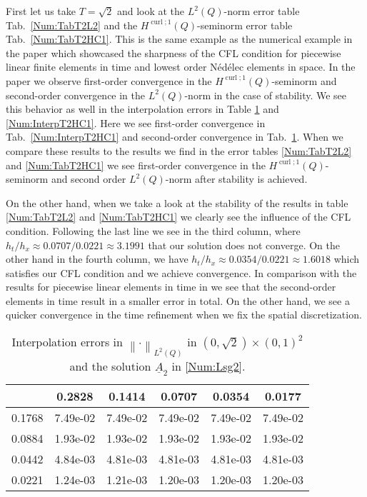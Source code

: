 \documentclass[a4paper,11pt]{article}
\newcommand{\cu}{\operatorname{curl}}
\renewcommand{\vec}[1]{\underline{#1}}
\newcommand{\norm}[1]{{\left\lVert{#1}\right\rVert}}
\begin{document}
First let us take $T=\sqrt{2}$ and look at the $L^2(Q)$-norm error table Tab.~\ref{Num:TabT2L2}  and the $H^{\cu;1}(Q)$-seminorm error  table Tab.~\ref{Num:TabT2HC1}. This is the same example as the numerical example in the paper \cite{HauserZank2023} which showcased the sharpness of the CFL condition for piecewise linear finite elements in time and lowest order Nédélec elements in space. In the paper \cite{HauserZank2023}  we observe first-order convergence in the $H^{\cu;1}(Q)$-seminorm  and second-order convergence in the $L^2(Q)$-norm in the case of stability.
 We see  this behavior as well in the interpolation errors in Table \ref{Num:InterpT2L2} and \ref{Num:InterpT2HC1}. Here we see first-order convergence in Tab.~\ref{Num:InterpT2HC1} and second-order convergence in Tab.~\ref{Num:InterpT2L2}. When we compare these results to the results we find in the error tables \ref{Num:TabT2L2} and \ref{Num:TabT2HC1} we see first-order convergence in the $H^{\cu;1}(Q)$-seminorm and second order $L^2(Q)$-norm after stability is achieved. 

On the other hand, when we take a look at the stability of the results in table \ref{Num:TabT2L2} and \ref{Num:TabT2HC1} we clearly see the influence of the CFL condition. Following the last line we see in the third column, where $h_t/h_x \approx 0.0707/0.0221 \approx 3.1991 $ that our solution does not converge. On the other hand in the fourth column, we have $h_t/h_x \approx 0.0354/0.0221 \approx 1.6018 $ which satisfies our CFL condition and we achieve convergence. In comparison with the results for piecewise linear elements in time in \cite{HauserZank2023} we see  that the second-order elements in time  result in a smaller error in total. On the other hand, we see a quicker convergence in the time refinement when we fix the spatial discretization. 


\begin{table}
	\begin{center}
	\caption{Interpolation errors in $\norm{\cdot}_{L^2(Q)}$  in $(0,\sqrt{2})\times(0,1)^2$ and the solution $\vec A_2$ in \eqref{Num:Lsg2}.}
	\begin{tabular}{c|ccccc}
		\diagbox{$h_x$}{\vspace*{-.1cm}$h_t$}&  0.2828 &  0.1414 &  0.0707 &  0.0354&  0.0177\\
		\hline\hline
		0.1768 & 7.49e-02 & 7.49e-02 & 7.49e-02 & 7.49e-02 & 7.49e-02 \\
		0.0884 & 1.93e-02 & 1.93e-02 & 1.93e-02 & 1.93e-02 & 1.93e-02 \\
		0.0442 & 4.84e-03 & 4.81e-03 & 4.81e-03 & 4.81e-03 & 4.81e-03 \\
		0.0221 & 1.24e-03 & 1.21e-03 & 1.20e-03 & 1.20e-03 & 1.20e-03 \\
	\end{tabular}
	\label{Num:InterpT2L2}
\end{center}
\end{table}
\end{document}
